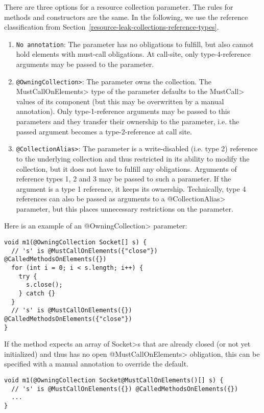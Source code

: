 There are three options for a resource collection parameter. The rules for methods and constructors are the same. In the following, we use the reference classification from Section~\ref{resource-leak-collections-reference-types}.
\begin{enumerate}
  \item \texttt{No annotation}: The parameter has no obligations to fulfill, but also cannot hold elements with must-call obligations. At call-site, only type-4-reference arguments may be passed to the parameter.
  \item \texttt{\<@OwningCollection>}: The parameter owns the collection. The \<MustCallOnElements> type of the parameter defaults to the \<MustCall> values of its component (but this may be overwritten by a manual annotation). Only type-1-reference arguments may be passed to this parameters and they transfer their ownership to the parameter, i.e. the passed argument becomes a type-2-reference at call site.
  \item \texttt{\<@CollectionAlias>}: The parameter is a write-disabled (i.e. type 2) reference to the underlying collection and thus restricted in its ability to modify the collection, but it does not have to fulfill any obligations. Arguments of reference types 1, 2 and 3 may be passed to such a parameter. If the argument is a type 1 reference, it keeps its ownership. Technically, type 4 references can also be passed as arguments to a \<@CollectionAlias> parameter, but this places unnecessary restrictions on the parameter.
\end{enumerate}

Here is an example of an \<@OwningCollection> parameter:
\begin{verbatim}
void m1(@OwningCollection Socket[] s) {
  // 's' is @MustCallOnElements({"close"}) @CalledMethodsOnElements({})
  for (int i = 0; i < s.length; i++) {
    try {
      s.close();
    } catch {}
  }
  // 's' is @MustCallOnElements({}) @CalledMethodsOnElements({"close"})
}
\end{verbatim}

If the method expects an array of \<Socket>s that are already closed (or not yet initialized) and thus has no open \<@MustCallOnElements> obligation, this can be specified with a manual annotation to override the default.

\begin{verbatim}
void m1(@OwningCollection Socket@MustCallOnElements()[] s) {
  // 's' is @MustCallOnElements({}) @CalledMethodsOnElements({})
  ...
}
\end{verbatim}

